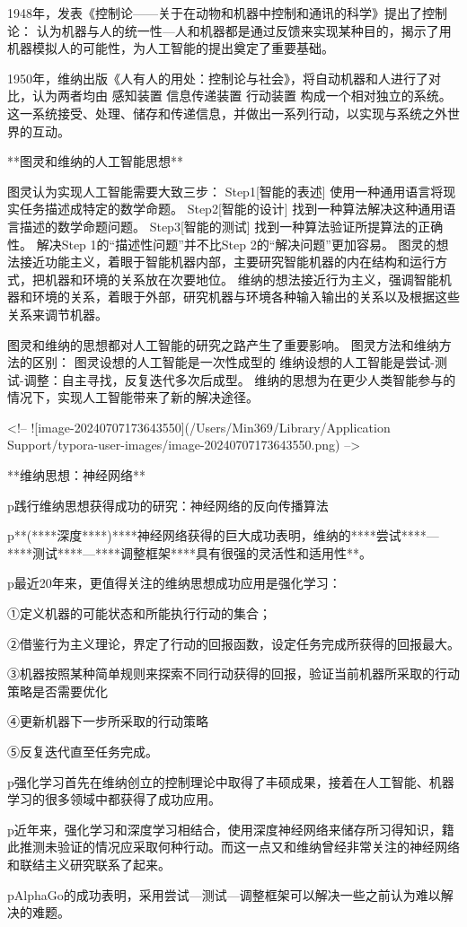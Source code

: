 1948年，发表《控制论——关于在动物和机器中控制和通讯的科学》提出了控制论：
认为机器与人的统一性—人和机器都是通过反馈来实现某种目的，揭示了用机器模拟人的可能性，为人工智能的提出奠定了重要基础。



1950年，维纳出版《人有人的用处：控制论与社会》，将自动机器和人进行了对比，认为两者均由
	感知装置	
	信息传递装置
	行动装置
  构成一个相对独立的系统。
这一系统接受、处理、储存和传递信息，并做出一系列行动，以实现与系统之外世界的互动。



**图灵和维纳的人工智能思想**

图灵认为实现人工智能需要大致三步：
Step1[智能的表述] 使用一种通用语言将现实任务描述成特定的数学命题。
Step2[智能的设计] 找到一种算法解决这种通用语言描述的数学命题问题。
Step3[智能的测试] 找到一种算法验证所提算法的正确性。
解决Step 1的“描述性问题”并不比Step 2的“解决问题”更加容易。
图灵的想法接近功能主义，着眼于智能机器内部，主要研究智能机器的内在结构和运行方式，把机器和环境的关系放在次要地位。
维纳的想法接近行为主义，强调智能机器和环境的关系，着眼于外部，研究机器与环境各种输入输出的关系以及根据这些关系来调节机器。



图灵和维纳的思想都对人工智能的研究之路产生了重要影响。
图灵方法和维纳方法的区别：
图灵设想的人工智能是一次性成型的
维纳设想的人工智能是尝试-测试-调整：自主寻找，反复迭代多次后成型。
维纳的思想为在更少人类智能参与的情况下，实现人工智能带来了新的解决途径。

<!-- ![image-20240707173643550](/Users/Min369/Library/Application Support/typora-user-images/image-20240707173643550.png) -->



**维纳思想：神经网络**

p践行维纳思想获得成功的研究：神经网络的反向传播算法

p**(****深度****)****神经网络获得的巨大成功表明，维纳的****尝试****—****测试****—****调整框架****具有很强的灵活性和适用性**。

p最近20年来，更值得关注的维纳思想成功应用是强化学习：

①定义机器的可能状态和所能执行行动的集合；

②借鉴行为主义理论，界定了行动的回报函数，设定任务完成所获得的回报最大。

③机器按照某种简单规则来探索不同行动获得的回报，验证当前机器所采取的行动策略是否需要优化

④更新机器下一步所采取的行动策略

⑤反复迭代直至任务完成。



p强化学习首先在维纳创立的控制理论中取得了丰硕成果，接着在人工智能、机器学习的很多领域中都获得了成功应用。

p近年来，强化学习和深度学习相结合，使用深度神经网络来储存所习得知识，籍此推测未验证的情况应采取何种行动。而这一点又和维纳曾经非常关注的神经网络和联结主义研究联系了起来。

pAlphaGo的成功表明，采用尝试—测试—调整框架可以解决一些之前认为难以解决的难题。

